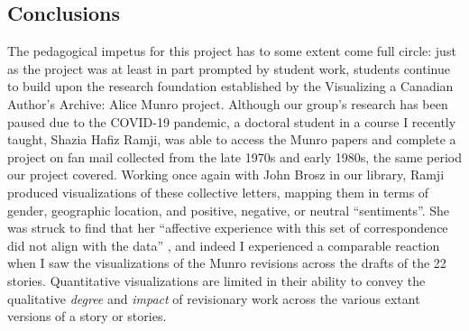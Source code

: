 \begin{paper}
\subsection*{Conclusions}

The pedagogical impetus for this project has to some extent come full
circle: just as the project was at least in part prompted by student
work, students continue to build upon the research foundation
established by the Visualizing a Canadian Author's Archive: Alice Munro
project. Although our group's research has been paused due to the
COVID-19 pandemic, a doctoral student in a course I recently taught,
Shazia Hafiz Ramji, was able to access the Munro papers and complete a
project on fan mail collected from the late 1970s and early 1980s, the
same period our project covered. Working once again with John Brosz in
our library, Ramji produced visualizations of these collective letters,
mapping them in terms of gender, geographic location, and positive,
negative, or neutral ``sentiments''. She was struck to find that her
``affective experience with this set of correspondence did not align
with the data'' \citep[3]{ramji_dear_2022}, and indeed I experienced a comparable
reaction when I saw the visualizations of the Munro revisions across the
drafts of the 22 stories. Quantitative visualizations are limited in
their ability to convey the qualitative \emph{degree} and \emph{impact}
of revisionary work across the various extant versions of a story or
stories.


\end{paper}
